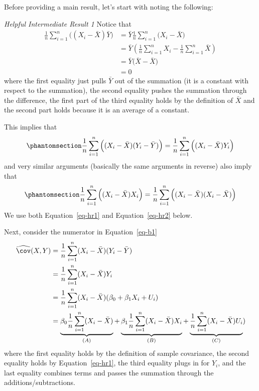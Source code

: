 \documentclass[
  letterpaper,
  DIV=11,
  numbers=noendperiod]{scrreprt}
\begin{document}
Before providing a main result, let's start with noting the following:

\emph{Helpful Intermediate Result 1} Notice that \begin{align*}
  \frac{1}{n}\sum_{i=1}^n \Big( (X_i - \bar{X})\bar{Y}\Big) &= \bar{Y} \frac{1}{n}\sum_{i=1}^n \Big( X_i-\bar{X} \Big) \\
  &= \bar{Y} \left( \frac{1}{n}\sum_{i=1}^n X_i - \frac{1}{n}\sum_{i=1}^n \bar{X} \right) \\
  &= \bar{Y} \Big(\bar{X} - \bar{X} \Big) \\
  &= 0
\end{align*} where the first equality just pulls \(\bar{Y}\) out of the
summation (it is a constant with respect to the summation), the second
equality pushes the summation through the difference, the first part of
the third equality holds by the definition of \(\bar{X}\) and the second
part holds because it is an average of a constant.

This implies that \begin{equation}\phantomsection\label{eq-hr1}{
  \frac{1}{n}\sum_{i=1}^n \Big( (X_i - \bar{X})(Y_i - \bar{Y})\Big) = \frac{1}{n}\sum_{i=1}^n \Big( (X_i - \bar{X})Y_i\Big) 
}\end{equation} and very similar arguments (basically the same arguments
in reverse) also imply that
\begin{equation}\phantomsection\label{eq-hr2}{
  \frac{1}{n}\sum_{i=1}^n \Big( (X_i - \bar{X})X_i\Big) = \frac{1}{n}\sum_{i=1}^n \Big( (X_i - \bar{X})(X_i - \bar{X})\Big)
}\end{equation} We use both Equation~\ref{eq-hr1} and
Equation~\ref{eq-hr2} below.

\vspace{100pt}

Next, consider the numerator in Equation~\ref{eq-b1} \begin{align*}
  \widehat{\cov}(X,Y) &= \frac{1}{n} \sum_{i=1}^n (X_i - \bar{X})(Y_i - \bar{Y}) \\
  &= \frac{1}{n} \sum_{i=1}^n (X_i - \bar{X})Y_i \\
  &= \frac{1}{n} \sum_{i=1}^n (X_i - \bar{X})(\beta_0 + \beta_1 X_i + U_i) \\
  &= \underbrace{\beta_0 \frac{1}{n} \sum_{i=1}^n (X_i - \bar{X})}_{(A)} + \underbrace{\beta_1 \frac{1}{n} \sum_{i=1}^n (X_i - \bar{X}) X_i}_{(B)} + \underbrace{\frac{1}{n} \sum_{i=1}^n (X_i - \bar{X}) U_i}_{(C)}) \\
\end{align*} where the first equality holds by the definition of sample
covariance, the second equality holds by Equation~\ref{eq-hr1}, the
third equality plugs in for \(Y_i\), and the last equality combines
terms and passes the summation through the additions/subtractions.
\end{document}

